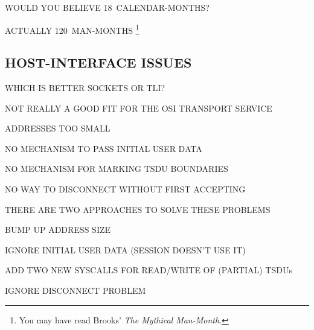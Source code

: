 \begin{bwslide}

\begin{nrtc}
\item	WOULD YOU BELIEVE 18~CALENDAR-MONTHS?

\item	ACTUALLY 120~MAN-MONTHS%
	\footnote{You may have read Brooks' {\em The Mythical Man-Month}.}
\end{nrtc}
\end{bwslide}


\begin{bwslide}
\part*	{HOST-INTERFACE ISSUES}\bf

\begin{nrtc}
\item	WHICH IS BETTER SOCKETS OR TLI?
\end{nrtc}
\end{bwslide}


\begin{bwslide}

\begin{nrtc}
\item	NOT REALLY A GOOD FIT FOR THE OSI TRANSPORT SERVICE
    \begin{nrtc}
    \item	ADDRESSES TOO SMALL

    \item	NO MECHANISM TO PASS INITIAL USER DATA

    \item	NO MECHANISM FOR MARKING TSDU BOUNDARIES

    \item	NO WAY TO DISCONNECT WITHOUT FIRST ACCEPTING
    \end{nrtc}

\item	THERE ARE TWO APPROACHES TO SOLVE THESE PROBLEMS
\end{nrtc}
\end{bwslide}


\begin{bwslide}

\begin{nrtc}
\item	BUMP UP ADDRESS SIZE

\item	IGNORE INITIAL USER DATA (SESSION DOESN'T USE IT)

\item	ADD TWO NEW SYSCALLS FOR READ/WRITE OF (PARTIAL) TSDUs

\item	IGNORE DISCONNECT PROBLEM
\end{nrtc}
\end{bwslide}


